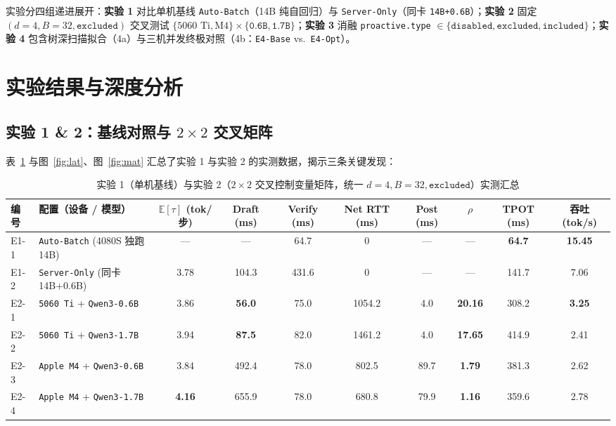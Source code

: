 \documentclass[conference]{IEEEtran}
\begin{document}
实验分四组递进展开：\textbf{实验 1} 对比单机基线 \texttt{Auto-Batch}（14B 纯自回归）与 \texttt{Server-Only}（同卡 \texttt{14B+0.6B}）；\textbf{实验 2} 固定 $(d{=}4, B{=}32, \texttt{excluded})$ 交叉测试 $\{\text{5060 Ti}, \text{M4}\} \times \{\texttt{0.6B}, \texttt{1.7B}\}$；\textbf{实验 3} 消融 \texttt{proactive.type} $\in \{\texttt{disabled}, \texttt{excluded}, \texttt{included}\}$；\textbf{实验 4} 包含树深扫描拟合（4a）与三机并发终极对照（4b：\texttt{E4-Base} vs.\ \texttt{E4-Opt}）。

\section{实验结果与深度分析}

\subsection{实验 1 \& 2：基线对照与 $2\times 2$ 交叉矩阵}

表~\ref{tab:e12} 与图~\ref{fig:lat}、图~\ref{fig:mat} 汇总了实验 1 与实验 2 的实测数据，揭示三条关键发现：

\begin{table}[t]
  \centering
  \caption{实验 1（单机基线）与实验 2（$2\times 2$ 交叉控制变量矩阵，统一 $d{=}4, B{=}32, \texttt{excluded}$）实测汇总}
  \label{tab:e12}
  \begin{tabular}{llcccccccc}
    \toprule
    编号 & 配置（设备 / 模型） & $\mathbb{E}[\tau]$ (tok/步) & Draft (ms) & Verify (ms) & Net RTT (ms) & Post (ms) & $\rho$ & TPOT (ms) & 吞吐 (tok/s) \\
    \midrule
    E1-1 & \texttt{Auto-Batch} (4080S 独跑 14B) & — & — & 64.7 & 0 & — & — & \textbf{64.7} & \textbf{15.45} \\
    E1-2 & \texttt{Server-Only} (同卡 14B+0.6B) & 3.78 & 104.3 & 431.6 & 0 & — & — & 141.7 & 7.06 \\
    \midrule
    E2-1 & \texttt{5060 Ti} + \texttt{Qwen3-0.6B} & 3.86 & \textbf{56.0} & 75.0 & 1054.2 & 4.0 & \textbf{20.16} & 308.2 & \textbf{3.25} \\
    E2-2 & \texttt{5060 Ti} + \texttt{Qwen3-1.7B} & 3.94 & \textbf{87.5} & 82.0 & 1461.2 & 4.0 & \textbf{17.65} & 414.9 & 2.41 \\
    E2-3 & \texttt{Apple M4} + \texttt{Qwen3-0.6B} & 3.84 & 492.4 & 78.0 & 802.5 & 89.7 & \textbf{1.79} & 381.3 & 2.62 \\
    E2-4 & \texttt{Apple M4} + \texttt{Qwen3-1.7B} & \textbf{4.16} & 655.9 & 78.0 & 680.8 & 79.9 & \textbf{1.16} & 359.6 & 2.78 \\
    \bottomrule
  \end{tabular}
\end{table}
\end{document}
